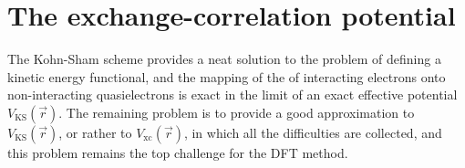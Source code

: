 \documentclass[11pt,bibliography=totoc,index=totoc]{scrbook}   %
\begin{document}





%
\section{The exchange-correlation potential}\label{sec:xc}
%

The Kohn-Sham scheme provides a neat solution to the problem of defining a kinetic energy functional, 
and the mapping of the of interacting electrons onto non-interacting quasielectrons is exact in the limit of an exact effective potential $V_{\text{KS}}(\vec{r})$.
The remaining problem is to provide a good approximation to $V_{\text{KS}}(\vec{r})$, or rather to $V_{\text{xc}}(\vec{r})$, in which all the difficulties are collected,
and this problem remains the top challenge for the DFT method.\cite[527]{Kantorovich:2004}\cite[153]{Parr:1994}
\end{document}
